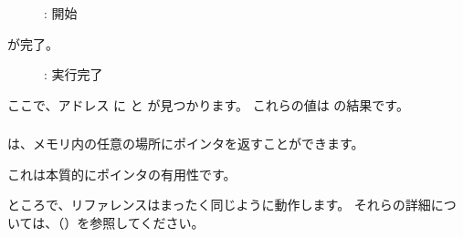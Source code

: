 \begin{figure}[H]
\centering
{}
\caption{\olly: \ttfone 開始}
\label{fig:pointers_olly_stk_2}
\end{figure}

\clearpage
\ttfone が完了。

\begin{figure}[H]
\centering
{}
\caption{\olly: \ttfone 実行完了}
\label{fig:pointers_olly_stk_3}
\end{figure}

ここで、アドレス \PtrsAddresses に と が見つかります。
これらの値は \ttfone の結果です。

\subsubsection{\Conclusion{}}
 
\ttfone は、メモリ内の任意の場所にポインタを返すことができます。

これは本質的にポインタの有用性です。

ところで、\Cpp リファレンスはまったく同じように動作します。
それらの詳細については、（）を参照してください。
